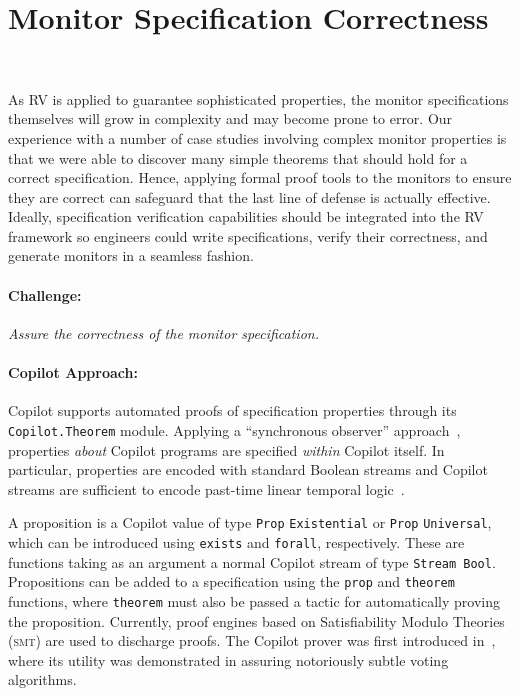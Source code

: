 \section{Monitor Specification Correctness}~\label{sec:verispec}

As RV is applied to  guarantee sophisticated properties, the
monitor specifications themselves will grow in complexity and may become
prone to error.  Our experience with a number of case studies
involving complex monitor properties is that we were able to discover
many simple theorems that should hold for a correct specification.  Hence, applying formal proof tools to the monitors to
ensure they are correct can safeguard that the last line of
defense is actually effective. Ideally, specification verification
capabilities should be integrated into the RV framework so engineers
could write specifications, verify their correctness, and generate
monitors in a seamless fashion.

\paragraph{Challenge:}  \emph{Assure  the correctness of the monitor
specification.}   

\paragraph{Copilot Approach:}  
 Copilot supports automated proofs of specification
 properties  through its {\tt Copilot.Theorem} module.  Applying a 
``synchronous observer'' approach~\cite{amast93}, properties \emph{about}
Copilot programs are specified \emph{within} Copilot itself. In particular,
properties are encoded with standard Boolean streams and Copilot streams are
sufficient to encode past-time linear temporal logic~\cite{ptltl}.

 A proposition is a Copilot value of type \texttt{Prop} \texttt{Existential}
 or \texttt{Prop} \texttt{Universal}, which can be introduced using \texttt{exists} and
\texttt{forall}, respectively. These are functions taking as an argument a
normal Copilot stream of type \lstinline{Stream Bool}. Propositions can be added
to a specification using the \texttt{prop} and \texttt{theorem} functions,
where \texttt{theorem} must also be passed a tactic for automatically proving
the proposition. Currently, proof engines  based on
Satisfiability Modulo Theories (\textsc{smt})   are used to discharge
proofs.  The Copilot prover was first introduced
in~\cite{pike-rv-15}, where its utility was demonstrated in assuring
notoriously subtle voting algorithms.

